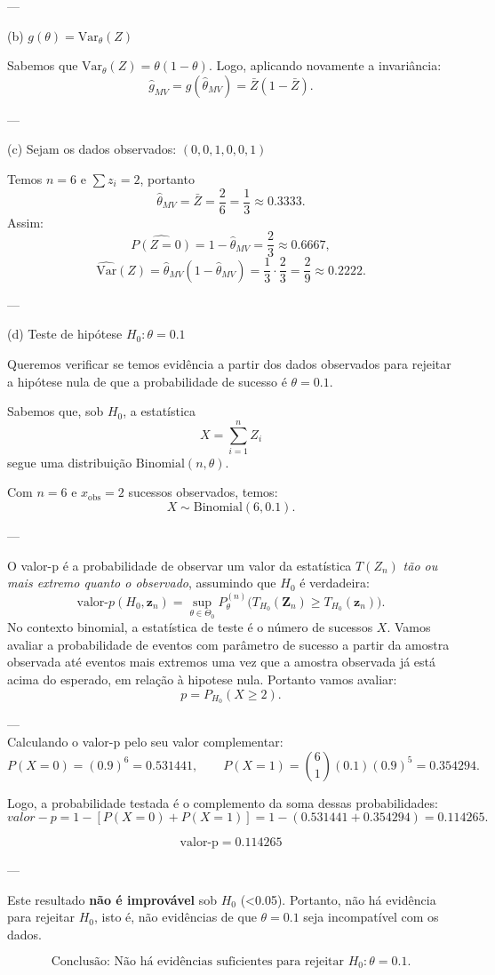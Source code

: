 ---

(b) \( g(\theta) = \mathrm{Var}_\theta(Z) \)

Sabemos que \( \mathrm{Var}_\theta(Z) = \theta(1 - \theta) \).  
Logo, aplicando novamente a invariância:
\[
\boxed{\hat{g}_{MV} = g(\hat{\theta}_{MV}) = \bar{Z}(1 - \bar{Z}).}
\]

---

(c) Sejam os dados observados: \( (0, 0, 1, 0, 0, 1) \)

Temos \( n = 6 \) e \( \sum z_i = 2 \), portanto
\[
\hat{\theta}_{MV} = \bar{Z} = \frac{2}{6} = \frac{1}{3} \approx 0.3333.
\]
Assim:
\[
\widehat{P(Z=0)} = 1 - \hat{\theta}_{MV} = \frac{2}{3} \approx 0.6667,
\]
\[
\widehat{\mathrm{Var}}(Z) = \hat{\theta}_{MV}(1 - \hat{\theta}_{MV})
= \frac{1}{3} \cdot \frac{2}{3} = \frac{2}{9} \approx 0.2222.
\]

---

(d) Teste de hipótese \( H_0: \theta = 0.1 \)

Queremos verificar se temos evidência a partir dos dados observados para rejeitar a hipótese nula 
de que a probabilidade de sucesso é $\theta = 0.1$.

Sabemos que, sob $H_0$, a estatística
\[
X = \sum_{i=1}^{n} Z_i
\]
segue uma distribuição $\text{Binomial}(n, \theta)$.

Com $n = 6$ e $x_{\text{obs}} = 2$ sucessos observados, temos:
\[
X \sim \text{Binomial}(6, 0.1).
\]

---
 
O valor-p é a probabilidade de observar um valor da estatística $T(Z_n)$ 
\textit{tão ou mais extremo quanto o observado}, assumindo que $H_0$ é verdadeira:
\[
\boxed{
\text{valor-}p(H_0, \mathbf{z}_n)
= \sup_{\theta \in \Theta_0}
P^{(n)}_{\theta}\!\big(
T_{H_0}(\mathbf{Z}_n)
\ge
T_{H_0}(\mathbf{z}_n)
\big).
}
\]
No contexto binomial, a estatística de teste é o número de sucessos $X$. Vamos avaliar a probabilidade de eventos
com parâmetro de sucesso a partir da amostra observada até eventos mais extremos uma vez que a amostra observada já está acima do esperado, em relação à hipotese nula. Portanto vamos avaliar:
\[
p = P_{H_0}(X \ge 2).
\]

---
\\
Calculando o valor-p pelo seu valor complementar:
\[
P(X=0) = (0.9)^6 = 0.531441, \qquad 
P(X=1) = \binom{6}{1}(0.1)(0.9)^5 = 0.354294.
\]

Logo, a probabilidade testada é o complemento da soma dessas probabilidades:
\[
valor-p = 1 - [P(X=0) + P(X=1)] = 1 - (0.531441 + 0.354294) = 0.114265.
\]

\[
\boxed{\text{valor-p} = 0.114265}
\]

---

Este resultado \textbf{não é improvável} sob $H_0$ (<0.05).  
Portanto, não há evidência para rejeitar  $H_0$, isto é, não evidências de que $\theta = 0.1$ seja incompatível com os dados.

\[
\boxed{\text{Conclusão: Não há evidências suficientes para rejeitar } H_0 : \theta = 0.1.}
\]
